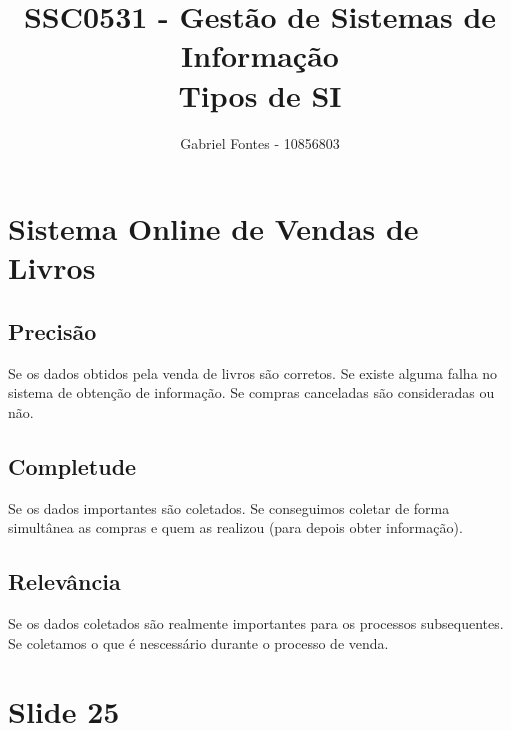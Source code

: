 \documentclass[12pt]{article}
\title{SSC0531 - Gestão de Sistemas de Informação \\ Tipos de SI}%
\author{Gabriel Fontes - 10856803}%
\begin{document}
\maketitle

\section{Sistema Online de Vendas de Livros}
\subsection{Precisão}
Se os dados obtidos pela venda de livros são corretos. Se existe alguma falha no sistema de obtenção de informação. Se compras canceladas são consideradas ou não.
\subsection{Completude}
Se os dados importantes são coletados. Se conseguimos coletar de forma simultânea as compras e quem as realizou (para depois obter informação).
\subsection{Relevância}
Se os dados coletados são realmente importantes para os processos subsequentes. Se coletamos o que é nescessário durante o processo de venda.

\section{Slide 25}
\end{document}
